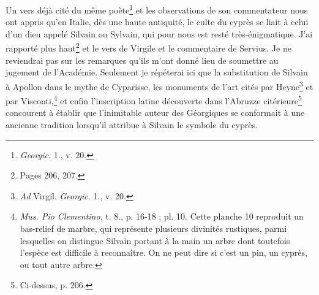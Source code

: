 \documentclass{article}
\begin{document}
Un vers déjà cité du même poète\footnote{\emph{Georgic.} 1., v. 20.} et les observations de son commentateur nous ont appris qu'en Italie, dès une haute antiquité, le culte du cyprès se liait à celui d'un dieu appelé Silvain ou Sylvain, qui pour nous est resté très-énigmatique. J'ai rapporté plus haut\footnote{Pages 206, 207.} et le vers de Virgile et le commentaire de Servius. Je ne reviendrai pas sur les remarques qu'ils m'ont donné lieu de soumettre au jugement de l'Académie. Seulement je répéterai ici que la substitution de Silvain à Apollon dans le mythe de Cyparisse, les monuments de l'art cités par Heyne\footnote{\emph{Ad} Virgil. \emph{Georgic.} 1., v. 20.} et par Visconti,\footnote{\emph{Mus. Pio Clementino}, t. 8., p. 16-18 ; pl. 10. Cette planche 10 reproduit un bas-relief de marbre, qui représente plusieurs divinités rustiques, parmi lesquelles on distingue Silvain portant à la main un arbre dont toutefois l'espèce est difficile à reconnaître. On ne peut dire si c'est un pin, un cyprès, ou tout autre arbre.} et enfin l'inscription latine découverte dans l'Abruzze citérieure\footnote{Ci-dessus, p. 206.} concourent à établir que l'inimitable auteur des Géorgiques se conformait à une ancienne tradition lorsqu'il attribue à Silvain le symbole du cyprès.
\end{document}
